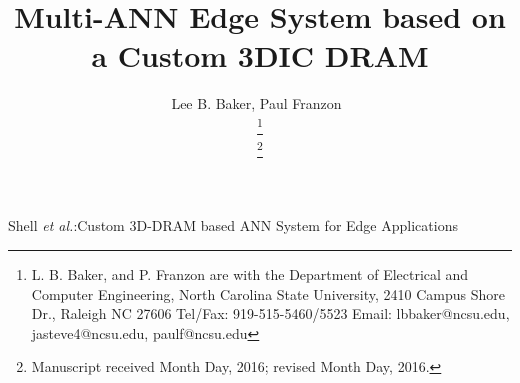 \documentclass[journal]{IEEEtran}
\begin{document}
%
\title{Multi-ANN Edge System based on a Custom 3DIC DRAM}
%
%
%
\author{{Lee B. Baker, Paul Franzon~}%

\thanks{L. B. Baker, and P. Franzon are with the Department of Electrical and Computer Engineering,
North Carolina State University,
2410 Campus Shore Dr., Raleigh NC 27606 
Tel/Fax:
919-515-5460/5523
Email: 
lbbaker@ncsu.edu,
jasteve4@ncsu.edu,
paulf@ncsu.edu}

\thanks{Manuscript received Month Day, 2016; revised Month Day, 2016.}}

% 
%



%
{Shell \MakeLowercase{\textit{et al.}}:Custom 3D-DRAM based ANN System for Edge Applications}
% 
\end{document}
